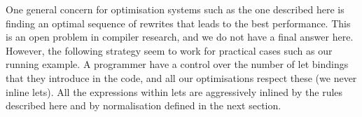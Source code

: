 One general concern for optimisation systems such as the one described
here is finding an optimal sequence of rewrites that leads to the best
performance.  This is an open problem in compiler research, and we do
not have a final answer here.  However, the following strategy seem to
work for practical cases such as our running example.  A programmer
have a control over the number of let bindings that they introduce
in the code, and all our optimisations respect these (we never inline
lets).  All the expressions within lets are aggressively inlined by
the rules described here and by normalisation defined in the next
section.

% 
